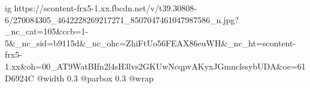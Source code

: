  
 
 
 
 

\ifcmt
  ig https://scontent-frx5-1.xx.fbcdn.net/v/t39.30808-6/270084305_4642228269217271_8507047461047987586_n.jpg?_nc_cat=105&ccb=1-5&_nc_sid=b9115d&_nc_ohc=ZhiFtUo56FEAX86euWH&_nc_ht=scontent-frx5-1.xx&oh=00_AT9WatBIfn2l4sH3lvs2GKUwNcqpvAKyxJGmnclssybUDA&oe=61D6924C
  @width 0.3
  @parbox 0.3
  @wrap \parpic[r]
\fi
